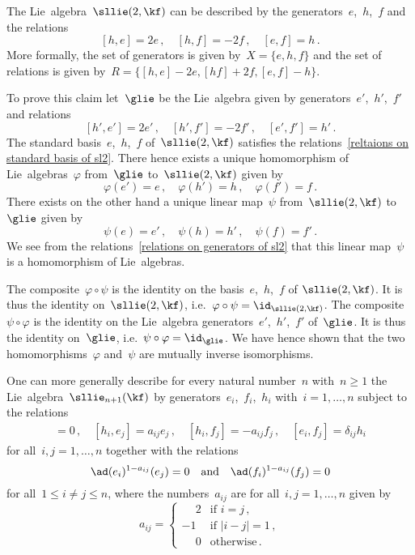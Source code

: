 \begin{example}
	The Lie~algebra~$\sllie(2, \kf)$ can be described by the generators~$e$,~$h$,~$f$ and the relations
	\begin{equation}
		\label{reltaions on standard basis of sl2}
		[h,e] = 2e \,,
		\quad
		[h,f] = -2f \,,
		\quad
		[e,f] = h \,.
	\end{equation}
	More formally, the set of generators is given by~$X = \{ e, h, f \}$ and the set of relations is given by~$ R = \{ [h,e] - 2e, [hf] + 2f, [e,f] - h \} $.

	To prove this claim let~$\glie$ be the Lie~algebra given by generators~$e'$,~$h'$,~$f'$ and relations
	\begin{equation}
		\label{relations on generators of sl2}
		[h', e'] = 2 e' \,,
		\quad
		[h', f'] = -2 f' \,,
		\quad
		[e', f'] = h' \,.
	\end{equation}
	The standard basis~$e$,~$h$,~$f$ of~$\sllie(2, \kf)$ satisfies the relations~\eqref{reltaions on standard basis of sl2}.
	There hence exists a unique homomorphism of Lie~algebras~$\varphi$ from~$\glie$ to~$\sllie(2, \kf)$ given by
	\[
		\varphi(e') = e \,,
		\quad
		\varphi(h') = h \,,
		\quad
		\varphi(f') = f \,.
	\]
	There exists on the other hand a unique linear map~$\psi$ from~$\sllie(2, \kf)$ to~$\glie$ given by
	\[
		\psi(e) = e' \,,
		\quad
		\psi(h) = h' \,,
		\quad
		\psi(f) = f' \,.
	\]
	We see from the relations~\eqref{relations on generators of sl2} that this linear map~$\psi$ is a homomorphism of Lie~algebras.

	The composite~$\varphi \circ \psi$ is the identity on the basis~$e$,~$h$,~$f$ of$~\sllie(2, \kf)$.
	It is thus the identity on~$\sllie(2, \kf)$, i.e.~$\varphi \circ \psi = \id_{\sllie(2, \kf)}$.
	The composite~$\psi \circ \varphi$ is the identity on the Lie~algebra generators~$e'$,~$h'$,~$f'$ of~$\glie$.
	It is thus the identity on~$\glie$, i.e.~$\psi \circ \varphi = \id_{\glie}$.
	We have hence shown that the two homomorphisms~$\varphi$ and~$\psi$ are mutually inverse isomorphisms.
\end{example}


\begin{remark}
	One can more generally describe for every natural number~$n$ with~$n \geq 1$ the Lie~algebra~$\sllie_{n+1}(\kf)$ by generators~$e_i$,~$f_i$,~$h_i$ with~$i = 1, \dotsc, n$ subject to the relations
	\begin{align*}
		[h_i, h_j] = 0  \,,
		\quad
		[h_i, e_j] = a_{ij} e_j \,,
		\quad
		[h_i, f_j] = -a_{ij}f_j  \,,
		\quad
		[e_i, f_j] = \delta_{ij} h_i
	\end{align*}
	for all~$i,j = 1, \dotsc, n$ together with the relations
	\[
		\ad(e_i)^{1-a_{ij}}(e_j) = 0
		\quad\text{and}\quad
		\ad(f_i)^{1-a_{ij}}(f_j) = 0
	\]
	for all~$1 \leq i \neq j \leq n$, where the numbers~$a_{ij}$ are for all~$i,j = 1, \dotsc, n$ given by
	\[
		a_{ij} =
		\begin{cases}
		\phantom{-}2 & \text{if $i = j$}  \,, \\
							-1 & \text{if $|i-j| = 1$}  \,, \\
		\phantom{-}0 & \text{otherwise} \,.
		\end{cases}
	\]
\end{remark}


